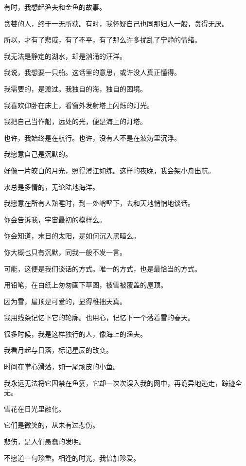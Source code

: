 \documentclass[12pt,a4paper]{article}
\def\blankrev{\vspace{1ex}}									%
\begin{document}
		\blankrev
		有时，我想起渔夫和金鱼的故事。\par
		贪婪的人，终于一无所获。有时，我怀疑自己也同那妇人一般，贪得无厌。\par
		所以，才有了悲戚，有了不平，有了那么许多扰乱了宁静的情绪。\par
		我无法是静定的湖水，却是汹涌的汪洋。\par
		我说，我想要一只船。这话里的意思，或许没人真正懂得。\par
		我需要的，是渡过。我独自的海，独自的困境。

		\blankrev
		我喜欢仰卧在床上，看窗外发射塔上闪烁的灯光。\par
		我把自己当作船，远处的光，便是海上的灯塔。\par
		也许，我始终是在航行。也许，没有人不是在波涛里沉浮。\par
		我愿意自己是沉默的。\par
		好像一片皎白的月光，照得澄江如练。这样的夜晚，我会架小舟出航。\par
		水总是多情的，无论陆地海洋。\par
		我愿意在所有人熟睡时，到一处峭壁下，去和天地悄悄地谈话。\par
		你会告诉我，宇宙最初的模样么。\par
		你会知道，末日的太阳，是如何沉入黑暗么。\par
		你大概也只有沉默，同我一般不发一言。\par
		可能，这便是我们谈话的方式。唯一的方式，也是最恰当的方式。

		\blankrev
		用铅笔，在白纸上匆匆画下草图，被雪被覆盖的屋顶。\par
		因为雪，屋顶是可爱的，显得稚拙天真。\par
		我用线条记忆下它的轮廓。也用心，记忆下一个落着雪的春天。\par
		很多时候，我是这样独行的人，像海上的渔夫。\par
		我看月起与日落，标记星辰的改变。\par
		时间在掌心滑落，如一尾顽皮的小鱼。\par
		我永远无法将它囚禁在鱼篓，它却一次次误入我的网中，再诡异地逃走，踪迹全无。

		\blankrev
		雪花在日光里融化。\par
		它们是微笑的，从未有过悲伤。\par
		悲伤，是人们愚蠢的发明。

	\endwriting



		不愿道一句珍重。相逢的时光，我倍加珍爱。
\end{document}
